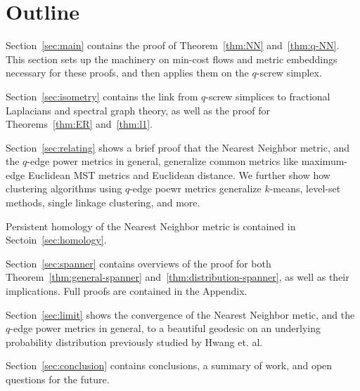 \section{Outline}
%  
Section~\ref{sec:main} contains the proof of Theorem~\ref{thm:NN}
and~\ref{thm:q-NN}. This section sets up the machinery on min-cost flows
and metric embeddings necessary for these proofs, and then applies them on
the $q$-screw simplex.

Section~\ref{sec:isometry} contains the link from $q$-screw simplices to
fractional Laplacians and spectral graph theory, as well as the proof for
Theorems~\ref{thm:ER} and~\ref{thm:l1}.

Section~\ref{sec:relating} shows a brief proof that the Nearest Neighbor
metric, and the $q$-edge power metrics in general, generalize common
metrics like maximum-edge Euclidean MST metrics and Euclidean distance. We
further show how clustering algorithms using $q$-edge poewr metrics
generalize $k$-means, level-set methods, single linkage clustering, and
more.

Persistent homology of the Nearest Neighbor metric is contained in
Sectoin~\ref{sec:homology}.

Section~\ref{sec:spanner} contains overviews of the proof for both
Theorem~\ref{thm:general-spanner} and~\ref{thm:distribution-spanner}, as
well as their implications. Full
proofs are contained in the Appendix.

Section~\ref{sec:limit} shows the convergence of the Nearest Neighbor
metic, and the $q$-edge power metrics in general, to a beautiful geodesic
on an underlying probability distribution previously studied by Hwang et.
al.

Section~\ref{sec:conclusion} contains conclusions, a summary of work, and
open questions for the future.
